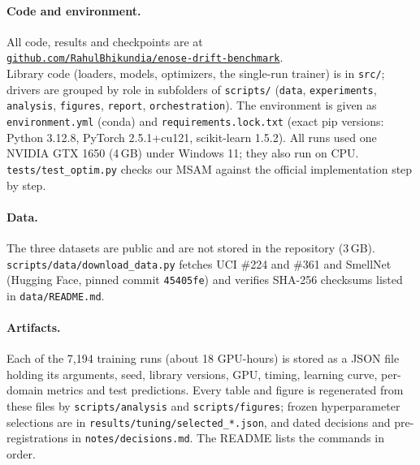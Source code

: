 \documentclass[10pt,twocolumn,letterpaper]{article}
\begin{document}
\paragraph{Code and environment.} All code, results and checkpoints are at\\
\mbox{\href{https://github.com/RahulBhikundia/enose-drift-benchmark}{\footnotesize\texttt{github.com/RahulBhikundia/enose-drift-benchmark}}}.\\
Library code (loaders, models, optimizers, the single-run trainer) is in \texttt{src/}; drivers are
grouped by role in subfolders of \texttt{scripts/} (\texttt{data}, \texttt{experiments}, \texttt{analysis},
\texttt{figures}, \texttt{report}, \texttt{orchestration}). The environment is
given as \texttt{environment.yml} (conda) and \texttt{requirements.lock.txt} (exact pip versions: Python 3.12.8,
PyTorch 2.5.1+cu121, scikit-learn 1.5.2). All runs used one NVIDIA GTX 1650 (4\,GB) under Windows 11; they also run
on CPU. \texttt{tests/test\_optim.py} checks our MSAM against the official implementation step by step.

\paragraph{Data.} The three datasets are public and are not stored in the repository (3\,GB).
\texttt{scripts/data/download\_data.py} fetches UCI \#224 and \#361 and SmellNet (Hugging Face, pinned commit
\texttt{45405fe}) and verifies SHA-256 checksums listed in \texttt{data/README.md}.

\paragraph{Artifacts.} Each of the 7{,}194 training runs (about 18 GPU-hours) is stored as a JSON file holding its
arguments, seed, library versions, GPU, timing, learning curve, per-domain metrics and test predictions. Every table
and figure is regenerated from these files by \texttt{scripts/analysis} and \texttt{scripts/figures}; frozen
hyperparameter selections are in \texttt{results/tuning/selected\_*.json}, and dated decisions and pre-registrations
in \texttt{notes/decisions.md}. The README lists the commands in order.
\end{document}
